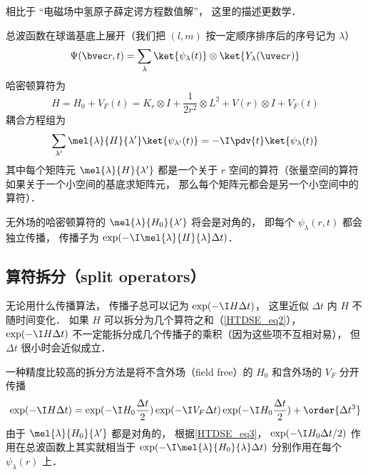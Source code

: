
\begin{issues}
\issueDraft
\end{issues}


相比于 “电磁场中氢原子薛定谔方程数值解”， 这里的描述更数学．

总波函数在球谐基底上展开（我们把 $(l,m)$ 按一定顺序排序后的序号记为 $\lambda$）
\begin{equation}\label{HTDSE_eq1}
\Psi(\bvec r, t) = \sum_\lambda \ket{\psi_\lambda(t)} \otimes \ket{Y_\lambda(\uvec r)}
\end{equation}
哈密顿算符为
\begin{equation}\label{HTDSE_eq2}
H = H_0 + V_F(t) = K_r\otimes I + \frac{1}{2r^2}\otimes L^2 + V(r) \otimes I + V_F(t)
\end{equation}
耦合方程组为
\begin{equation}\label{HTDSE_eq3}
\sum_{\lambda'} \mel{\lambda}{H}{\lambda'} \ket{\psi_{\lambda'}(t)} = -\I\pdv{t} \ket{\psi_\lambda(t)}
\end{equation}
其中每个矩阵元 $ \mel{\lambda}{H}{\lambda'}$ 都是一个关于 $r$ 空间的算符（张量空间的算符如果关于一个小空间的基底求矩阵元， 那么每个矩阵元都会是另一个小空间中的算符）．

无外场的哈密顿算符的 $\mel{\lambda}{H_0}{\lambda'}$ 将会是对角的， 即每个 $\psi_{\lambda}(r, t)$ 都会独立传播， 传播子为 $\exp(-\I \mel{\lambda}{H}{\lambda} \Delta t)$．

\subsection{算符拆分（split operators）}
无论用什么传播算法， 传播子总可以记为 $\exp(-\I H \Delta t)$， 这里近似 $\Delta t$ 内 $H$ 不随时间变化． 如果 $H$ 可以拆分为几个算符之和（\autoref{HTDSE_eq2}）， $\exp(-\I H \Delta t)$ 不一定能拆分成几个传播子的乘积（因为这些项不互相对易）， 但 $\Delta t$ 很小时会近似成立．

一种精度比较高的拆分方法是将不含外场（field free）的 $H_0$ 和含外场的 $V_F$ 分开传播
\begin{equation}
\exp(-\I H\Delta t) = \exp(-\I H_0\frac{\Delta t}{2})\exp(-\I V_F\Delta t) \exp(-\I H_0\frac{\Delta t}{2}) + \order{\Delta t^3}
\end{equation}
由于 $\mel{\lambda}{H_0}{\lambda'}$ 都是对角的， 根据\autoref{HTDSE_eq3}， $\exp(-\I H_0 \Delta t/2)$ 作用在总波函数上其实就相当于 $\exp(-\I\mel{\lambda}{H_0}{\lambda} \Delta t)$ 分别作用在每个 $\psi_{\lambda}(r)$ 上．

